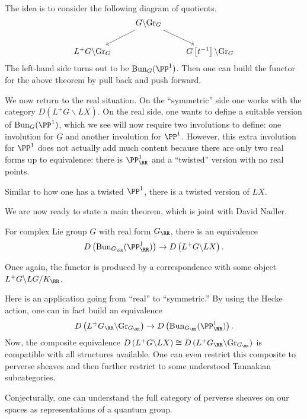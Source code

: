 \documentclass{article}
\begin{document}
\begin{remark}
	The idea is to consider the following diagram of quotients.
	\[\begin{tikzcd}[cramped]
		& {G\backslash\mathrm{Gr}_G} \\
		{L^+G\backslash\mathrm{Gr}_G} && {G\left[t^{-1}\right]\backslash\mathrm{Gr}_G}
		\arrow[from=1-2, to=2-1]
		\arrow[from=1-2, to=2-3]
	\end{tikzcd}\]
	The left-hand side turns out to be $\mathrm{Bun}_G(\PP^1)$. Then one can build the functor for the above theorem by pull back and push forward.
\end{remark}
We now return to the real situation. On the ``symmetric'' side one works with the category $D(L^+G\backslash LX)$. On the real side, one wants to define a suitable version of $\mathrm{Bun}_G(\PP^1)$, which we see will now require two involutions to define: one involution for $G$ and another involution for $\PP^1$. However, this extra involution for $\PP^1$ does not actually add much content because there are only two real forms up to equivalence: there is $\PP^1_\RR$ and a ``twisted'' version with no real points.
\begin{remark}
	Similar to how one has a twisted $\PP^1$, there is a twisted version of $LX$.
\end{remark}
We are now ready to state a main theorem, which is joint with David Nadler.
\begin{theorem}
	For complex Lie group $G$ with real form $G_\RR$, there is an equivalence
	\[D\left(\mathrm{Bun}_{G_\RR}(\PP^1_\RR)\right)\to D\left(L^+G\backslash LX\right).\]
\end{theorem}
\begin{remark}
	Once again, the functor is produced by a correspondence with some object $L^+G\backslash LG/K_\RR$.
\end{remark}
\begin{remark}
	Here is an application going from ``real'' to ``symmetric.'' By using the Hecke action, one can in fact build an equivalence
	\[D\left(L^+G_\RR\backslash\mathrm{Gr}_{G_\RR}\right)\to D\left(\mathrm{Bun}_{G_\RR}(\PP^1_\RR)\right).\]
	Now, the composite equivalence $D\left(L^+G\backslash LX\right)\cong D\left(L^+G_\RR\backslash\mathrm{Gr}_{G_\RR}\right)$ is compatible with all structures available. One can even restrict this composite to perverse sheaves and then further restrict to some understood Tannakian subcategories.
\end{remark}
\begin{remark}
	Conjecturally, one can understand the full category of perverse sheaves on our spaces as representations of a quantum group.
\end{remark}
\end{document}
